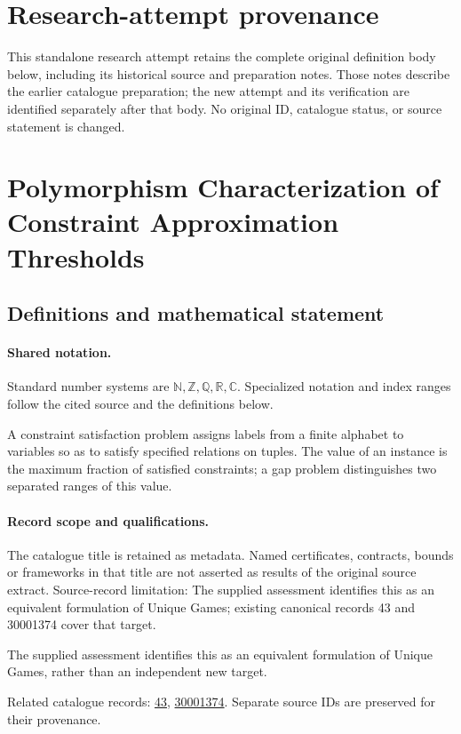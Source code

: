 \documentclass[11pt]{article}
\begin{document}
\section*{Research-attempt provenance}
This standalone research attempt retains the complete original definition body below,
including its historical source and preparation notes. Those notes describe the
earlier catalogue preparation; the new attempt and its verification are identified
separately after that body. No original ID, catalogue status, or source statement is changed.

\section{Polymorphism Characterization of Constraint Approximation Thresholds}\label{statement}

\subsection{Definitions and mathematical statement}

\paragraph{Shared notation.}Standard number systems are $\mathbb N,\mathbb Z,\mathbb Q,\mathbb R,\mathbb C$. Specialized notation and index ranges follow the cited source and the definitions below.


A constraint satisfaction problem assigns labels from a finite alphabet to variables so as to satisfy specified relations on tuples. The value of an instance is the maximum fraction of satisfied constraints; a gap problem distinguishes two separated ranges of this value.
\paragraph{Record scope and qualifications.}
The catalogue title is retained as metadata. Named certificates, contracts, bounds or frameworks in that title are not asserted as results of the original source extract.
Source-record limitation: The supplied assessment identifies this as an equivalent formulation of Unique Games; existing canonical records 43 and 30001374 cover that target.

The supplied assessment identifies this as an equivalent formulation of Unique Games, rather than an independent new target.

Related catalogue records: \href{https://mehmetmars7.github.io/Erdosproblems-llm-hunter/problem.html?type=open_problems&id=43}{43}, \href{https://mehmetmars7.github.io/Erdosproblems-llm-hunter/problem.html?type=open_problems&id=30001374}{30001374}. Separate source IDs are preserved for their provenance.
\end{document}
